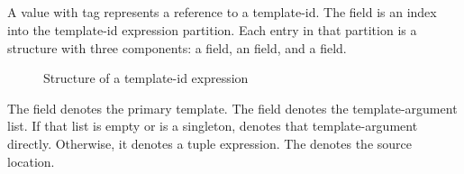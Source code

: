


\subsection{}
\label{sec:ifc:ExprSort:TemplateId}

A  value with tag  represents a reference to a template-id.
The  field is an index into the template-id expression partition.
Each entry in that partition is a structure with three components: a  field, an  field, and a  field.
%
\begin{figure}[H]
	\centering
	\caption{Structure of a template-id expression}
	\label{fig:ifc-template-id-expression-structure}
\end{figure}
%
The  field denotes the primary template.
The  field denotes the template-argument list.
If that list is empty or is a singleton,  denotes that template-argument directly.
Otherwise, it denotes a tuple expression.
The  denotes the source location.



\subsection{}
\label{sec:ifc:ExprSort:UnqualifiedId}

